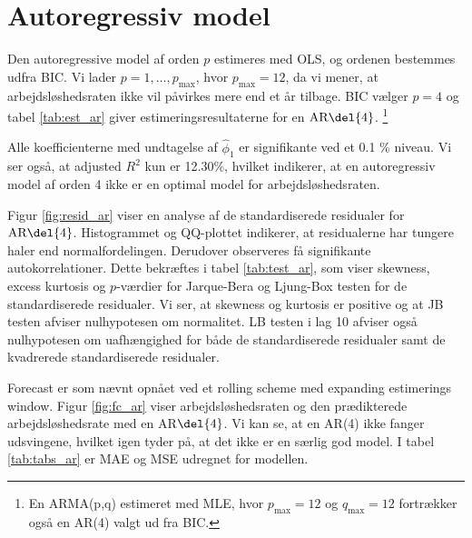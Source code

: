 \section{Autoregressiv model}
Den autoregressive model af orden \(p\) estimeres med OLS, og ordenen bestemmes udfra BIC.
Vi lader $p = 1, \ldots, p_{\max}$, hvor \(p_\text{max}=12\), da vi mener, at arbejdsløshedsraten ikke vil påvirkes mere end et år tilbage.
BIC vælger \(p=4\) og tabel \ref{tab:est_ar} giver estimeringsresultaterne for en \(\text{AR} \del{4}\). \footnote{En ARMA(p,q) estimeret med MLE, hvor $p_{\max} = 12$ og $q_{\max} = 12$ fortrækker også en AR(4) valgt ud fra BIC.}
%


Alle koefficienterne med undtagelse af $\widehat\phi_1$ er signifikante ved et 0.1 \% niveau. 
Vi ser også, at adjusted $R^2$ kun er 12.30\%, hvilket indikerer, at en autoregressiv model af orden 4 ikke er en optimal model for arbejdsløshedsraten. 

Figur \ref{fig:resid_ar} viser en analyse af de standardiserede residualer for \(\text{AR} \del{4}\). 
Histogrammet og QQ-plottet indikerer, at residualerne har tungere haler end normalfordelingen. 
Derudover observeres få signifikante autokorrelationer.
Dette bekræftes i tabel \ref{tab:test_ar}, som viser skewness, excess kurtosis og \(p\)-værdier for Jarque-Bera og Ljung-Box testen for de standardiserede residualer. 
Vi ser, at skewness og kurtosis er positive og at JB testen afviser nulhypotesen om normalitet. 
LB testen i lag 10 afviser også nulhypotesen om uafhængighed for både de standardiserede residualer samt de kvadrerede standardiserede residualer. 
%

%

Forecast er som nævnt opnået ved et rolling scheme med expanding estimerings window. 
Figur \ref{fig:fc_ar} viser arbejdsløshedsraten og den prædikterede arbejdsløshedsrate med en AR\(\del{4}\).
Vi kan se, at en AR(4) ikke fanger udsvingene, hvilket igen tyder på, at det ikke er en særlig god model. 
I tabel \ref{tab:tabs_ar} er MAE og MSE udregnet for modellen. 



\newpage